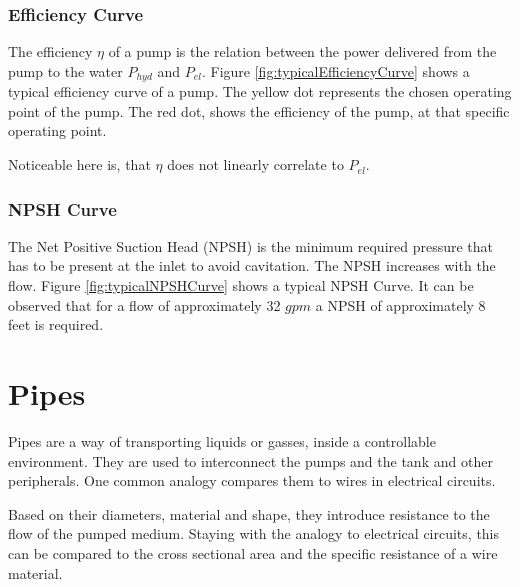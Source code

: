 \subsubsection{Efficiency Curve}
The efficiency $\eta$ of a pump is the relation between the power delivered from the pump to the water $P_{hyd}$ and $P_{el}
$.
Figure \ref{fig:typicalEfficiencyCurve} shows a typical efficiency curve of a pump. The yellow dot represents the 
chosen operating point of the pump. The red dot, shows the efficiency of the pump, at that specific operating point.

Noticeable here is,
that $\eta$ does not linearly correlate to $P_{el}$.

\subsubsection{NPSH Curve}
The Net Positive Suction Head (NPSH) is the minimum required pressure
that has to be present at the inlet to avoid cavitation.
The NPSH increases with the flow.
Figure \ref{fig:typicalNPSHCurve} shows a typical NPSH Curve.
It can be observed that for a flow of approximately 32 $gpm$
a NPSH of approximately 8 feet is required.


\section{Pipes}
Pipes are a way of transporting liquids or gasses, inside a controllable environment.
They are used to interconnect the pumps and the tank and other peripherals.
One common analogy compares them to wires in electrical circuits.

Based on their diameters, material and shape,
they introduce resistance to the flow of the pumped medium.
Staying with the analogy to electrical circuits,
this can be compared to the cross sectional area and the specific resistance of a wire material.

